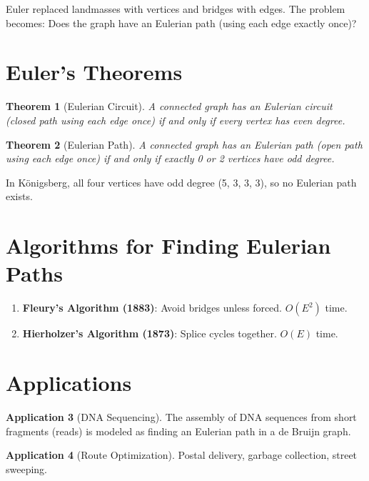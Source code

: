\documentclass[11pt,a4paper,twoside]{book}
\theoremstyle{eulerstyle}
\newtheorem{theorem}{Theorem}[chapter]
\theoremstyle{definition}
\newtheorem{application}[theorem]{Application}
\begin{document}
Euler replaced landmasses with vertices and bridges with edges. The problem becomes: Does the graph have an Eulerian path (using each edge exactly once)?

\section{Euler's Theorems}

\begin{theorem}[Eulerian Circuit]
A connected graph has an Eulerian circuit (closed path using each edge once) if and only if every vertex has even degree.
\end{theorem}

\begin{theorem}[Eulerian Path]
A connected graph has an Eulerian path (open path using each edge once) if and only if exactly 0 or 2 vertices have odd degree.
\end{theorem}

In Königsberg, all four vertices have odd degree (5, 3, 3, 3), so no Eulerian path exists.

\section{Algorithms for Finding Eulerian Paths}

\begin{enumerate}
    \item \textbf{Fleury's Algorithm (1883)}: Avoid bridges unless forced. $O(E^2)$ time.
    \item \textbf{Hierholzer's Algorithm (1873)}: Splice cycles together. $O(E)$ time.
\end{enumerate}

\section{Applications}

\begin{application}[DNA Sequencing]
The assembly of DNA sequences from short fragments (reads) is modeled as finding an Eulerian path in a de Bruijn graph.
\end{application}

\begin{application}[Route Optimization]
Postal delivery, garbage collection, street sweeping.
\end{application}

\end{document}
